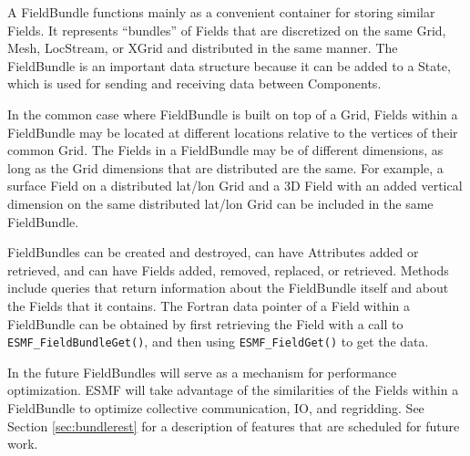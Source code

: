 
A FieldBundle functions mainly as a convenient container for storing
similar Fields.  It represents ``bundles'' of Fields that are 
discretized on the same Grid, Mesh, LocStream, or XGrid and distributed in the same manner.
The FieldBundle is an important data structure because it can be added to a State, 
which is used for sending and receiving data between Components.

In the common case where FieldBundle is built on top of a Grid,
Fields within a FieldBundle may be located at different locations relative 
to the vertices of their common Grid.  The Fields in a FieldBundle may
be of different dimensions, as long as the Grid dimensions that 
are distributed are the same.  For example, a surface Field on 
a distributed lat/lon Grid and a 3D Field with an added vertical 
dimension on the same distributed lat/lon Grid can be included
in the same FieldBundle.
 
FieldBundles can be created and destroyed, can have Attributes 
added or retrieved, and can have Fields added, removed, replaced, or retrieved.
Methods include queries that return information about the FieldBundle
itself and about the Fields that it contains.  The Fortran 
data pointer of a Field within a FieldBundle can be obtained 
by first retrieving the Field with a call to {\tt ESMF\_FieldBundleGet()},
and then using {\tt ESMF\_FieldGet()} to get the data.

In the future FieldBundles will serve as a mechanism for performance
optimization.  ESMF will take advantage of the similarities of the
Fields within a FieldBundle to optimize collective communication,
IO, and regridding.  See Section \ref{sec:bundlerest} for a 
description of features that are scheduled for future work.
